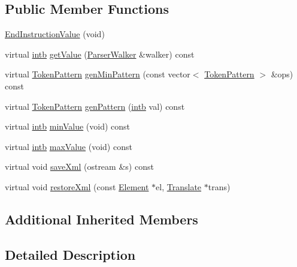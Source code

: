 \subsection*{Public Member Functions}
\begin{DoxyCompactItemize}
\item 
\mbox{\hyperlink{class_end_instruction_value_a75d23590dd2d8516547877d3bfbf858b}{End\+Instruction\+Value}} (void)
\item 
virtual \mbox{\hyperlink{types_8h_aa925ba3e627c2df89d5b1cfe84fb8572}{intb}} \mbox{\hyperlink{class_end_instruction_value_ab5a3514129e205fe42efa1dba471e496}{get\+Value}} (\mbox{\hyperlink{class_parser_walker}{Parser\+Walker}} \&walker) const
\item 
virtual \mbox{\hyperlink{class_token_pattern}{Token\+Pattern}} \mbox{\hyperlink{class_end_instruction_value_a268e8aae070151119c5b253522d35b0e}{gen\+Min\+Pattern}} (const vector$<$ \mbox{\hyperlink{class_token_pattern}{Token\+Pattern}} $>$ \&ops) const
\item 
virtual \mbox{\hyperlink{class_token_pattern}{Token\+Pattern}} \mbox{\hyperlink{class_end_instruction_value_a8a4ae4571a25a17accdf7260e1412b44}{gen\+Pattern}} (\mbox{\hyperlink{types_8h_aa925ba3e627c2df89d5b1cfe84fb8572}{intb}} val) const
\item 
virtual \mbox{\hyperlink{types_8h_aa925ba3e627c2df89d5b1cfe84fb8572}{intb}} \mbox{\hyperlink{class_end_instruction_value_a24592780f2f2f6e5baa22337d621c0e9}{min\+Value}} (void) const
\item 
virtual \mbox{\hyperlink{types_8h_aa925ba3e627c2df89d5b1cfe84fb8572}{intb}} \mbox{\hyperlink{class_end_instruction_value_af6230d95fcb68cfbcf0522e74df0232c}{max\+Value}} (void) const
\item 
virtual void \mbox{\hyperlink{class_end_instruction_value_abdfcdbc8fd5dc96723bbc85ee3e9d24d}{save\+Xml}} (ostream \&s) const
\item 
virtual void \mbox{\hyperlink{class_end_instruction_value_a6909b360cf6bdfc41fc1bc5d15bf9df3}{restore\+Xml}} (const \mbox{\hyperlink{class_element}{Element}} $\ast$el, \mbox{\hyperlink{class_translate}{Translate}} $\ast$trans)
\end{DoxyCompactItemize}
\subsection*{Additional Inherited Members}


\subsection{Detailed Description}


